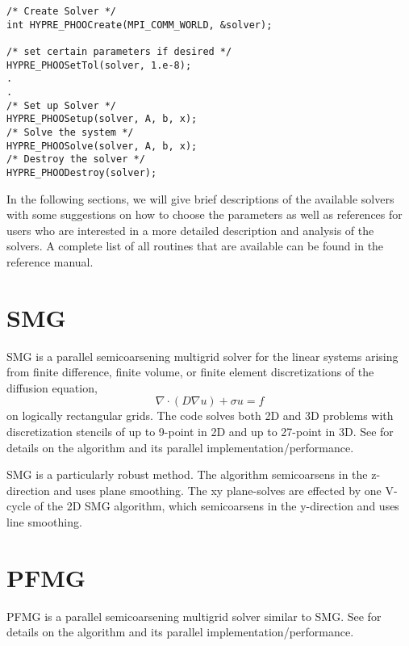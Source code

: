 \begin{display}
\begin{verbatim}
/* Create Solver */
int HYPRE_PHOOCreate(MPI_COMM_WORLD, &solver); 

/* set certain parameters if desired */
HYPRE_PHOOSetTol(solver, 1.e-8);
.
.
/* Set up Solver */
HYPRE_PHOOSetup(solver, A, b, x);
/* Solve the system */
HYPRE_PHOOSolve(solver, A, b, x);
/* Destroy the solver */
HYPRE_PHOODestroy(solver);
\end{verbatim}
\end{display}

In the following sections, we will give brief descriptions of the available \hypre{} solvers
with some suggestions on how to choose the parameters as well as references for users 
who are interested in a more detailed description and analysis of the solvers.
A complete list of all routines that are available can be found in the reference manual.

\section{SMG}

SMG is a parallel semicoarsening multigrid solver for the linear
systems arising from finite difference, finite volume, or finite
element discretizations of the diffusion equation,
\begin{equation}
\nabla \cdot ( D \nabla u ) + \sigma u = f
\end{equation}
on logically rectangular grids.  The code solves both 2D and 3D
problems with discretization stencils of up to 9-point in 2D and up to
27-point in 3D.  See
\cite{SSchaffer_1998a,PNBrown_RDFalgout_JEJones_2000,RDFalgout_JEJones_2000}
for details on the algorithm and its parallel implementation/performance.

SMG is a particularly robust method.  The algorithm semicoarsens in
the z-direction and uses plane smoothing.  The xy plane-solves are
effected by one V-cycle of the 2D SMG algorithm, which semicoarsens in
the y-direction and uses line smoothing.


\section{PFMG}

PFMG is a parallel semicoarsening multigrid solver similar to SMG.
See \cite{SFAshby_RDFalgout_1996,RDFalgout_JEJones_2000} for details
on the algorithm and its parallel implementation/performance.

